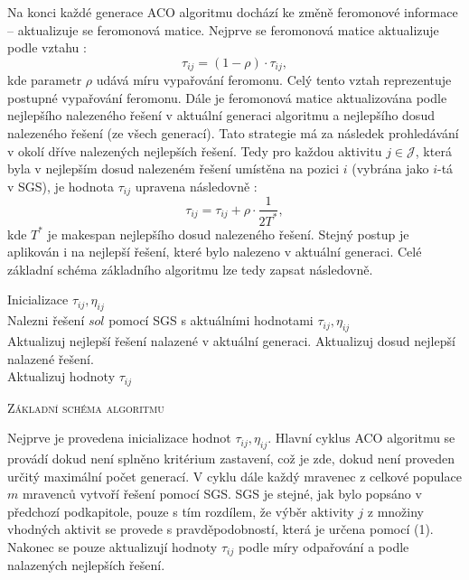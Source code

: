\documentclass[a4paper,12pt]{article}
\begin{document}
Na konci každé generace ACO algoritmu dochází ke změně feromonové informace -- aktualizuje se feromonová matice.
Nejprve se feromonová matice aktualizuje podle vztahu \cite{1027745, Merkle00antcolony}:
$$
  \tau_{ij} = (1-\rho)\cdot\tau_{ij},
$$
kde parametr $\rho$ udává míru vypařování feromonu. Celý tento vztah reprezentuje postupné vypařování feromonu.
Dále je feromonová matice aktualizována podle nejlep\-šího nalezeného řešení v aktuální generaci algoritmu a nejlepšího
dosud nalezeného řešení (ze všech generací). Tato strategie má za následek prohledávání v okolí dříve nalezených 
nejlepších řešení. Tedy pro každou aktivitu $j\in\mathcal{J}$, která byla v nejlepším dosud nalezeném řešení umístěna na pozici $i$ 
(vybrána jako $i$-tá v SGS), je hodnota $\tau_{ij}$ upravena následovně \cite{1027745, Merkle00antcolony}:
$$
  \tau_{ij} = \tau_{ij} + \rho\cdot\frac{1}{2T^*},
$$
kde $T^*$ je makespan nejlepšího dosud nalezeného řešení. Stejný postup je aplikován i na nejlepší řešení, které
bylo nalezeno v aktuální generaci. 
Celé základní schéma základního algoritmu lze tedy zapsat následovně.

\medskip
\begin{algorithm}[H]
 \SetNlSty{}{}{:}
 \SetNlSkip{-1.2em}
 \SetInd{1em}{1em}
 \BlankLine
 \Indentp{1.7em}
    Inicializace $\tau_{ij}, \eta_{ij}$ \\
     {
       {
	 Nalezni řešení $sol$ pomocí SGS s aktuálními hodnotami $\tau_{ij}, \eta_{ij}$ \\
	 Aktualizuj nejlepší řešení nalazené v aktuální generaci.
      }
      Aktualizuj dosud nejlepší nalazené řešení.\\
      Aktualizuj hodnoty $\tau_{ij}$
    }
 \caption{\textsc{Základní schéma algoritmu}}
 \label{fastSlam}
\end{algorithm}

\medskip
Nejprve je provedena inicializace hodnot $\tau_{ij}, \eta_{ij}$. Hlavní cyklus ACO algoritmu se provádí dokud 
není splněno kritérium zastavení, což je zde, dokud není proveden určitý maximální počet generací. V cyklu
dále každý mravenec z celkové populace $m$ mravenců vytvoří řešení pomocí SGS. SGS je stejné, jak bylo
popsáno v předchozí podkapitole, pouze s tím rozdílem, že výběr aktivity $j$ z množiny vhodných aktivit
se provede s pravděpodobností, která je určena pomocí (1). Nakonec se pouze aktualizují hodnoty $\tau_{ij}$
podle míry odpařování a podle nalazených nejlepších řešení.
\end{document}
